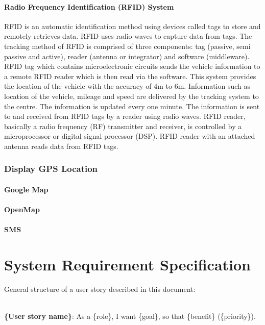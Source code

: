 \paragraph{Radio Frequency Identification (RFID) System}
RFID is an automatic identification
method using devices called tags to store and remotely retrieves data. RFID uses radio
waves to capture data from tags. The tracking method of RFID is comprised of three
components: tag (passive, semi passive and active), reader (antenna or integrator) and
software (middleware). RFID tag which contains microelectronic circuits sends the
vehicle information to a remote RFID reader which is then read via the software. This
system provides the location of the vehicle with the accuracy of 4m to 6m. Information
such as location of the vehicle, mileage and speed are delivered by the tracking system to
the centre. The information is updated every one minute. The information is sent to and
received from RFID tags by a reader using radio waves. RFID reader, basically a radio
frequency (RF) transmitter and receiver, is controlled by a microprocessor or digital
signal processor (DSP). RFID reader with an attached antenna reads data from RFID
tags.


\subsubsection{Display GPS Location}
\paragraph{Google Map}

\paragraph{OpenMap}

\paragraph{SMS}


\section{System Requirement Specification}
General structure of a user story described in this document: 
\\ \\
\begin{normalsize}
\textbf{\{User story name\}}: As a \{role\}, I want \{goal\}, so that \{benefit\} (\{priority\}).
\end{normalsize}

